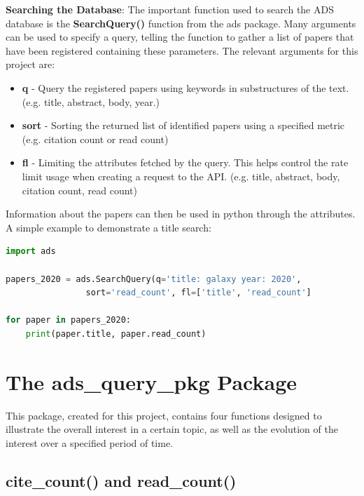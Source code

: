 \documentclass[10pt, letterpaper]{article}
\begin{document}
\textbf{Searching the Database}: The important function used to search the ADS database is the \textbf{SearchQuery()} function from the ads package. Many arguments can be used to specify a query, telling the function to gather a list of papers that have been registered containing these parameters. The relevant arguments for this project are:
\begin{itemize}
    \item \textbf{q}  -  Query the registered papers using keywords in substructures of the text. (e.g. title, abstract, body, year.)
    \item \textbf{sort} - Sorting the returned list of identified papers using a specified metric (e.g. citation count or read count)
    \item \textbf{fl} - Limiting the attributes fetched by the query. This helps control the rate limit usage when creating a request to the API. (e.g. title, abstract, body, citation count, read count) 
\end{itemize}

\vspace{2cm}

Information about the papers can then be used in python through the attributes. A simple example to demonstrate a title search: \\[5mm]

\begin{lstlisting}[language=python, label= Simple Example]
import ads

papers_2020 = ads.SearchQuery(q='title: galaxy year: 2020',
                sort='read_count', fl=['title', 'read_count']

for paper in papers_2020:
    print(paper.title, paper.read_count)
\end{lstlisting}

\vspace{0.5cm}

\section{The ads\_query\_pkg Package}

This package, created for this project, contains four functions designed to illustrate the overall interest in a certain topic, as well as the evolution of the interest over a specified period of time.

\subsection{cite\_count() and read\_count()}
\end{document}

